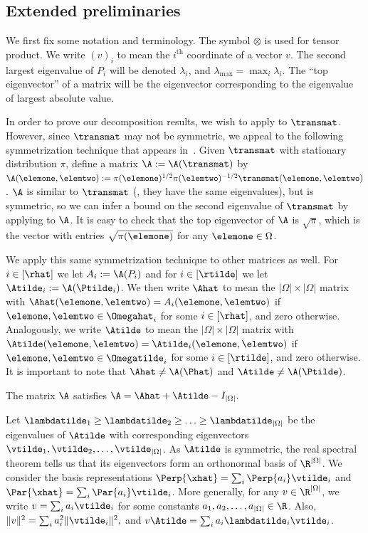 %
\subsection{Extended preliminaries}  %
\label{sec:decompPrelim}

We first fix some notation and terminology. The symbol $\otimes$ is 
used for tensor product.  We write $(v)_i$ to mean the $i^{\text{th}}$ 
coordinate of a vector $v$. The second largest eigenvalue of $P_i$ will 
be denoted $\lambda_i$, and $\lambda_{\max} = \max_i \lambda_i$. The 
``top eigenvector'' of a matrix will be the eigenvector corresponding 
to the eigenvalue of largest absolute value.

In order to prove our decomposition results, we wish to apply 
 to $\transmat$.  However, since $\transmat$ may 
not be symmetric, we appeal to the following symmetrization technique 
that appears in~\cite[p. 153]{LPW06}. Given $\transmat$ with stationary 
distribution $\pi$, define a matrix $\A := \A(\transmat)$ by 
$\A(\elemone,\elemtwo) :=\pi(\elemone)^{1/2}\pi(\elemtwo)^{-1/2}\transmat(\elemone,\elemtwo)$. 
$\A$ is similar to $\transmat$ (\ie,  they have the same eigenvalues), 
but is symmetric, so we can infer a bound on the second eigenvalue of 
$\transmat$ by applying  to $\A$. It is easy to 
check that the top eigenvector of $\A$ is $\sqrt{\pi}$, which is the 
vector with entries $\sqrt{\pi(\elemone)}$ for any $\elemone\in\Omega$. 

We apply this same symmetrization technique to other matrices as well. 
For $i \in [\rhat]$ we let $A_i := \A(P_i)$ and for $i \in 
[\rtilde]$ we let $\Atilde_i := \A(\Ptilde_i)$.  We then write $\Ahat$ 
to mean the $|\Omega| \times |\Omega|$ matrix with 
$\Ahat(\elemone,\elemtwo) = A_i(\elemone,\elemtwo)$ if 
$\elemone,\elemtwo \in \Omegahat_i$ for some $i \in [\rhat]$, and zero 
otherwise. Analogously, we write $\Atilde$ to mean the $|\Omega| \times 
|\Omega|$ matrix with $\Atilde(\elemone,\elemtwo) = 
\Atilde_i(\elemone,\elemtwo)$ if $\elemone,\elemtwo \in \Omegatilde_i$ 
for some $i \in [\rtilde]$, and zero otherwise. It is important to note 
that $\Ahat \not= \A(\Phat)$ and 
$\Atilde \not= \A(\Ptilde)$.  
\begin{proposition}\label{prop:matdecomp}
The matrix $\A$ satisfies 
$\A = \Ahat+\Atilde-I_{|\Omega|}.$
\end{proposition}

Let $\lambdatilde_1\geq\lambdatilde_2\geq\ldots\geq 
\lambdatilde_{|\Omega|}$ be the eigenvalues of $\Atilde$ with 
corresponding eigenvectors $\vtilde_1,\vtilde_2,\ldots, 
\vtilde_{|\Omega|}$.  As $\Atilde$ is symmetric, the real spectral 
theorem tells us that its eigenvectors form an orthonormal basis of 
$\R^{|\Omega|}$.  We consider the basis representations $\Perp{\xhat} = 
\sum_i\Perp{a_i}\vtilde_i$ and $\Par{\xhat} = 
\sum_i\Par{a_i}\vtilde_i$.  More generally, for any $v \in 
\R^{|\Omega|}$, we write  $v=\sum_{i}a_i\vtilde_i$ for some constants 
$a_1,a_2,\ldots, a_{|\Omega|} \in \R$.  Also, $\|v\|^2 = \sum_i 
a_i^2\|\vtilde_i\|^2,$ and $v\Atilde = \sum_i 
a_i\lambdatilde_i\vtilde_i$.

